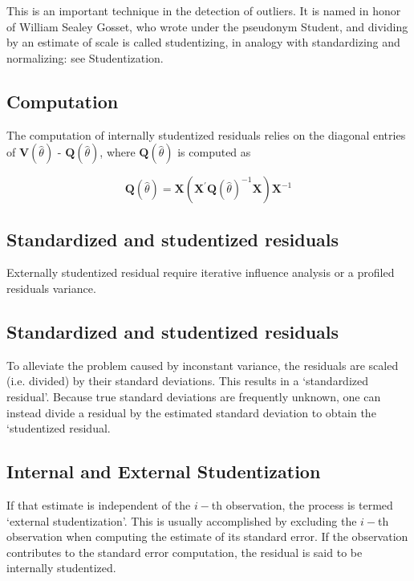 \documentclass[Main.tex]{subfiles}
\begin{document}
This is an important technique in the detection of outliers. It is named in honor of William Sealey Gosset, who wrote under the pseudonym Student, and dividing by an estimate of scale is called studentizing, in analogy with standardizing and normalizing: see Studentization.

	

	\subsection{Computation}%
	
	The computation of internally studentized residuals relies on the diagonal entries of $\boldsymbol{V} (\hat{\theta})$ - $\boldsymbol{Q} (\hat{\theta})$, where $\boldsymbol{Q} (\hat{\theta})$ is computed as
	
	\[ \boldsymbol{Q} (\hat{\theta}) = \boldsymbol{X} ( \boldsymbol{X}^{\prime}\boldsymbol{Q} (\hat{\theta})^{-1}\boldsymbol{X})\boldsymbol{X}^{-1} \]
	
	\newpage
\subsection{Standardized and studentized residuals} %

Externally  studentized residual require iterative influence analysis or a profiled residuals variance.




	\subsection{Standardized and studentized residuals} %
	
	To alleviate the problem caused by inconstant variance, the residuals are scaled (i.e. divided) by their standard deviations. This results in a `standardized residual'. Because true standard deviations are frequently unknown, one can instead divide a residual by the estimated standard deviation to obtain the `studentized residual. 
	
	
	\subsection{Internal and External Studentization} %
	If that estimate is independent of the $i-$th observation, the process is termed `external studentization'. This is usually accomplished by excluding the $i-$th observation when computing the estimate of its standard error. If the observation contributes to the
	standard error computation, the residual is said to be internally studentized.
	
\end{document}
